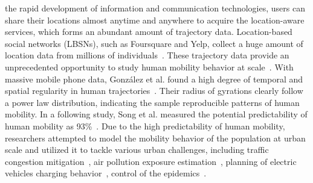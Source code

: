 \documentclass[10pt,journal,compsoc]{IEEEtran}
\begin{document}

 the rapid development of information and communication technologies, users can share their locations almost anytime and anywhere to acquire the location-aware services, which forms an abundant amount of trajectory data. Location-based social networks (LBSNs), such as Foursquare and Yelp, collect a huge amount of location data from millions of individuals~\cite{zhang2020next,xu2021understanding}. These trajectory data provide an unprecedented opportunity to study human mobility behavior at scale~\cite{gonzalez2008understanding,jiang2016timegeo}. With massive mobile phone data, Gonz{\'a}lez et al. found a high degree of temporal and spatial regularity in human trajectories~\cite{gonzalez2008understanding}. Their radius of gyrations clearly follow a power law distribution, indicating the sample reproducible patterns of human mobility. In a following study, Song et al. measured the potential predictability of human mobility as 93\%~\cite{song2010limits}. Due to the high predictability of human mobility, researchers attempted to model the mobility behavior of the population at urban scale and utilized it to tackle various urban challenges, including traffic congestion mitigation~\cite{ccolak2016understanding,xu2017collective,olmos2018macroscopic}, air pollution exposure estimation~\cite{xu2019unraveling}, planning of electric vehicles charging behavior~\cite{xu2018planning}, control of the epidemics~\cite{tizzoni2014use,chang2020mobility}.
\end{document}

